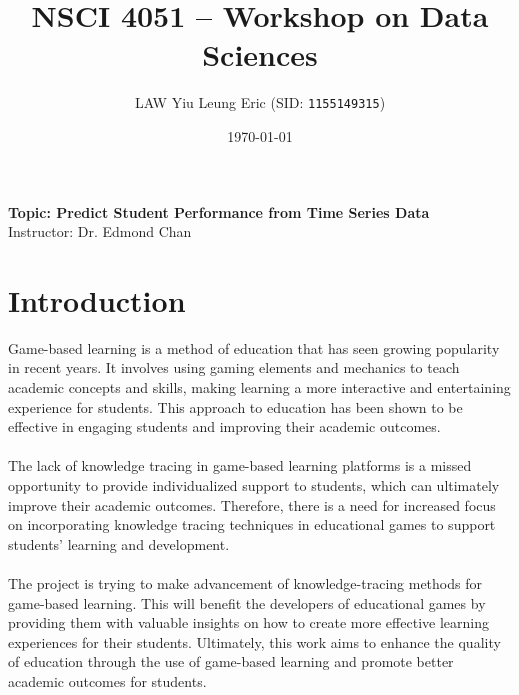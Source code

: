 \documentclass[11pt,a4paper]{article}
\begin{document}
    
    \thispagestyle{empty}
    \title{\textsc{NSCI 4051} -- Workshop on Data Sciences}
    \author{
        LAW Yiu Leung Eric (SID: \texttt{1155149315})
    }
    \date{\today}
    \maketitle

    \begin{center}
        {\Large \textbf{Topic: Predict Student Performance from Time Series Data}} \\
        Instructor: Dr. Edmond Chan
    \end{center}
    
    \pagestyle{plain} 
    
    \tableofcontents
    \listoffigures
    \listoftables
    \lstlistoflistings
    
    \newpage

    \pagestyle{fancy}
    \setcounter{page}{1}
    
    \section{Introduction}
    Game-based learning is a method of education that has seen growing popularity in recent years. It involves using gaming elements and mechanics to teach academic concepts and skills, making learning a more interactive and entertaining experience for students. This approach to education has been shown to be effective in engaging students and improving their academic outcomes. \\
    \\
    The lack of knowledge tracing in game-based learning platforms is a missed opportunity to provide individualized support to students, which can ultimately improve their academic outcomes. Therefore, there is a need for increased focus on incorporating knowledge tracing techniques in educational games to support students' learning and development. \\
    \\
    The project is trying to make advancement of knowledge-tracing methods for game-based learning. This will benefit the developers of educational games by providing them with valuable insights on how to create more effective learning experiences for their students. Ultimately, this work aims to enhance the quality of education through the use of game-based learning and promote better academic outcomes for students.
\end{document}
